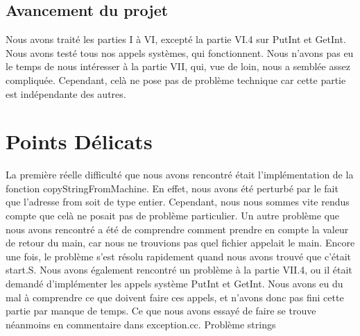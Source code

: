 \documentclass[12pt]{article}
\begin{document}
\bigbreak
\subsection{Avancement du projet}
Nous avons traité les parties I à VI, excepté la partie VI.4 sur \textcolor{blue2}{PutInt} et \textcolor{blue2}{GetInt}. Nous avons testé tous nos appels systèmes, qui fonctionnent. Nous n'avons pas eu le temps de nous intéresser à la partie VII, qui, vue de loin, nous a semblée assez compliquée. Cependant, celà ne pose pas de problème technique car cette partie est indépendante des autres.

\bigbreak
\bigbreak
\section {Points Délicats}
La première réelle difficulté que nous avons rencontré était l'implémentation de la fonction \textcolor{red2}{copyStringFromMachine}. En effet, nous avons été perturbé par le fait que l'adresse from soit de type entier. Cependant, nous nous sommes vite rendus compte que celà ne posait pas de problème particulier.
\newline
Un autre problème que nous avons rencontré a été de comprendre comment prendre en compte la valeur de retour du main, car nous ne trouvions pas quel fichier appelait le main. Encore une fois, le problème s'est résolu rapidement quand nous avons trouvé que c'était \textcolor{vert2}{start.S}.
\newline
Nous avons également rencontré un problème à la partie VII.4, ou il était demandé d'implémenter les appels système \textcolor{blue2}{PutInt} et \textcolor{blue2}{GetInt}. Nous avons eu du mal à comprendre ce que doivent faire ces appels, et n'avons donc pas fini cette partie par manque de temps. Ce que nous avons essayé de faire se trouve néanmoins en commentaire dans \textcolor{vert2}{exception.cc}.
\newline
Problème strings

\bigbreak
\bigbreak
\end{document}
